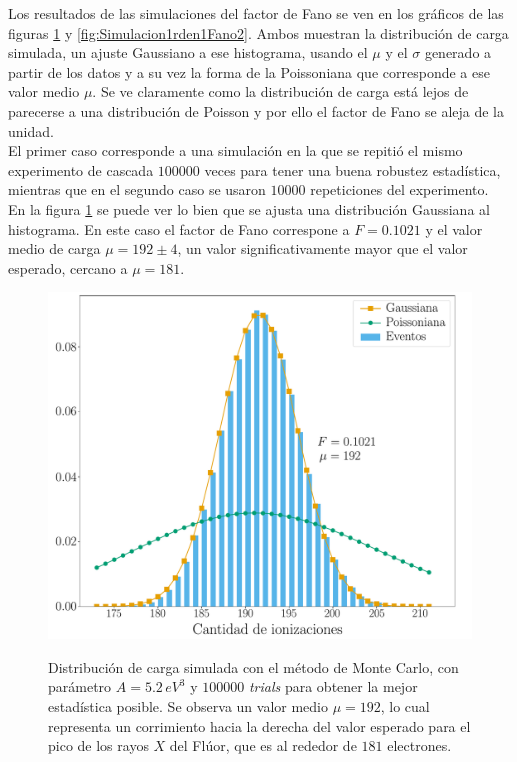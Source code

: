 \indent Los resultados de las simulaciones del factor de Fano se ven en los gráficos de las figuras \ref{fig:Simulacion1rden1Fano1} y \ref{fig:Simulacion1rden1Fano2}. Ambos muestran la distribución de carga simulada, un ajuste Gaussiano a ese histograma, usando el $\mu$ y el $\sigma$ generado a partir de los datos y a su vez la forma de la Poissoniana que corresponde a ese valor medio $\mu$. Se ve claramente como la distribución de carga está lejos de parecerse a una distribución de Poisson y por ello el factor de Fano se aleja de la unidad.\\
\indent El primer caso corresponde a una simulación en la que se repitió el mismo experimento de cascada $100000$ veces para tener una buena robustez estadística, mientras que en el segundo caso se usaron $10000$ repeticiones del experimento.\\
\indent En la figura \ref{fig:Simulacion1rden1Fano1} se puede ver lo bien que se ajusta una distribución Gaussiana al histograma. En este caso el factor de Fano correspone a $F = 0.1021$ y el valor medio de carga $\mu = 192 \pm 4$, un valor significativamente mayor que el valor esperado, cercano a $\mu = 181$.
\begin{figure}%
    \centering
\textit{}    \includegraphics[scale=0.35]{Figs/Fano_677_Eloss0_100ktrials.pdf}
    \caption{\footnotesize{Distribución de carga simulada con el método de Monte Carlo, con parámetro $A = 5.2\,\si{eV}^{3}$ y $100000$ \textit{trials} para obtener la mejor estadística posible. Se observa un valor medio $\mu = 192$, lo cual representa un corrimiento hacia la derecha del valor esperado para el pico de los rayos $X$ del Flúor, que es al rededor de $181$ electrones.}}
    \label{fig:Simulacion1rden1Fano1}
\end{figure}
